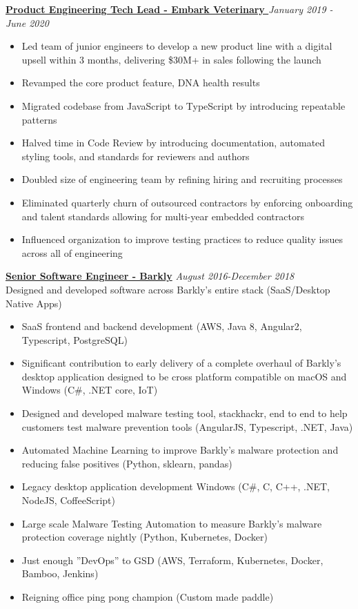 \documentclass[line]{res}
\begin{document}
\begin{resume}
{\bf \underline{Product Engineering Tech Lead - Embark Veterinary }} \hfill {\sl January 2019 - June 2020}\\[2pt]
 \begin{itemize} \itemsep -1pt %
	\item Led team of junior engineers to develop a new product line with a digital upsell within 3 months, delivering \$30M+ in sales following the launch
	\item Revamped the core product feature, DNA health results
	\item Migrated codebase from JavaScript to TypeScript by introducing repeatable patterns
	\item Halved time in Code Review by introducing documentation, automated styling tools, and standards for reviewers and authors
	\item Doubled size of engineering team by refining hiring and recruiting processes
	\item Eliminated quarterly churn of outsourced contractors by enforcing onboarding and talent standards allowing for multi-year embedded contractors
	\item Influenced organization to improve testing practices to reduce quality issues across all of engineering
 \end{itemize}
 
{\bf \underline{Senior Software Engineer - Barkly}} \hfill {\sl August 2016-December 2018}\\[2pt]
Designed and developed software across Barkly's entire stack (SaaS/Desktop Native Apps)
 \begin{itemize} \itemsep -1pt %
 	\item SaaS frontend and backend development (AWS, Java 8, Angular2, Typescript, PostgreSQL)
	\item Significant contribution to early delivery of a complete overhaul of Barkly’s desktop application designed to be
cross platform compatible on macOS and Windows (C\#, .NET core, IoT)
	\item Designed and developed malware testing tool, stackhackr, end to end to help customers test malware prevention
tools (AngularJS, Typescript, .NET, Java)
	\item Automated Machine Learning to improve Barkly’s malware protection and reducing false positives (Python, sklearn,
pandas)
	\item Legacy desktop application development Windows (C\#, C, C++, .NET, NodeJS, CoffeeScript)
	\item Large scale Malware Testing Automation to measure Barkly’s malware protection coverage nightly (Python, Kubernetes, Docker)
	\item Just enough ”DevOps” to GSD (AWS, Terraform, Kubernetes, Docker, Bamboo, Jenkins)
	\item Reigning office ping pong champion (Custom made paddle)
 \end{itemize}
 

\end{resume}
\end{document}
